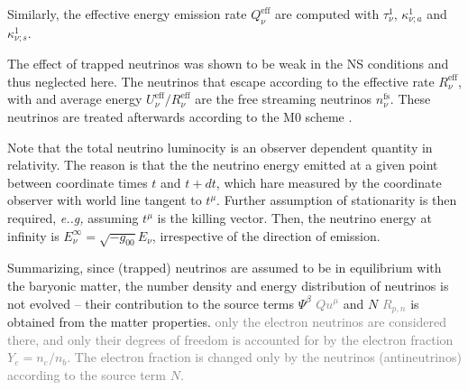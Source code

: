 \documentclass[11pt,a4paper,headinclude=true,DIV=14,BCOR=8mm,chapterprefix,listof=totoc,twoside,openright,abstracton]{scrbook}
\newcommand{\gray}[1]{\textcolor{gray}{#1}}
\begin{document}
Similarly, the effective energy emission rate $Q_{\nu}^{\text{eff}}$ are computed with $\tau_{\nu}^1$, $\kappa_{\nu;a}^1$ and $\kappa_{\nu;s}^1$.

The effect of trapped neutrinos was shown to be weak in the NS conditions \cite{Galeazzi:2013mia} and thus neglected here.
The neutrinos that escape according to the effective rate $R_{\nu}^{\text{eff}}$,
with and average energy $U_{\nu}^{\text{eff}}/R_{\nu}^{\text{eff}}$ are the free streaming neutrinos $n_{\nu}^{\text{fs}}$. 
These neutrinos are treated afterwards according to the M0 scheme \cite{Radice:2016dwd}.


Note that the total neutrino luminocity is an observer dependent quantity in relativity. 
The reason is that the the neutrino energy emitted at a given point between coordinate times $t$ and $t+dt$, which hare measured by the coordinate observer with world line tangent to $t^{\mu}$. 
Further assumption of stationarity is then required, \textit{e..g,} assuming $t^{\mu}$ is the killing vector. Then, the neutrino energy at infinity is $E_{\nu}^{\infty} = \sqrt{-g_{00}}E_{\nu}$, irrespective of the direction of emission.

Summarizing, since (trapped) neutrinos are assumed to be in equilibrium with the baryonic matter, the number density and energy distribution of neutrinos is not evolved -- their contribution to the source terms $\Psi^{\beta}$ \gray{$Qu^{\mu}$} and $N$ \gray{$R_{p,n}$} is obtained from the matter properties.
\gray{only the electron neutrinos are considered there, and only their degrees of freedom is accounted for by the electron fraction $Y_e=n_e/n_b$.
The electron fraction is changed only by the neutrinos (antineutrinos) according to the source term $N$.}
\end{document}
